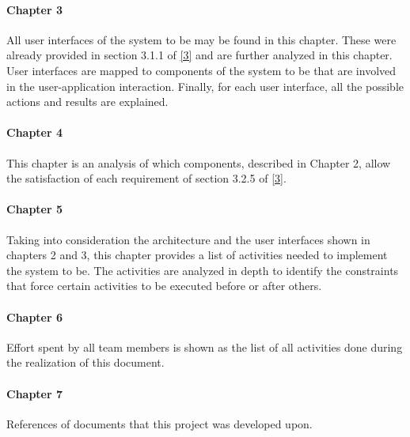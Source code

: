 \documentclass[../DD.tex]{subfiles}
\begin{document}
		\paragraph{Chapter 3}
			All user interfaces of the system to be may be found in this chapter. These were already provided in section 3.1.1 of \hyperref[ref:3]{[3]} and are further analyzed in this chapter. User interfaces are mapped to components of the system to be that are involved in the user-application interaction. Finally, for each user interface, all the possible actions and results are explained. 
		\paragraph{Chapter 4}
			This chapter is an analysis of which components, described in Chapter 2, allow the satisfaction of each requirement of section 3.2.5 of \hyperref[ref:3]{[3]}. 
		\paragraph{Chapter 5}
			Taking into consideration the architecture and the user interfaces shown in chapters 2 and 3, this chapter provides a list of activities needed to implement the system to be. The activities are analyzed in depth to identify the constraints that force certain activities to be executed before or after others. 
		\paragraph{Chapter 6}
			Effort spent by all team members is shown as the list of all activities done during the realization of this document.
		\paragraph{Chapter 7}
			References of documents that this project was developed upon.
		
\end{document}
